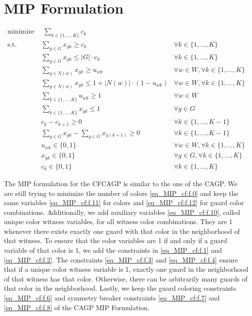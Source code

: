 \section{MIP Formulation}

\begin{align}
\label{eq_MIP_cf:f.0} \mbox{minimize}~& \;\sum_{k\in \{1,\ldots,K\}} c_{k}& \\
\label{eq_MIP_cf:f.1} \mbox{s.t. } &\sum_{g \in G}x_{gk} \geq c_{k} & \forall k\in \{1,\ldots,K\}\\
\label{eq_MIP_cf:f.2}&\sum_{g\in G}x_{gk} \leq |G|\cdot  c_{k} & \forall k\in \{1,\ldots,K\}\\
\label{eq_MIP_cf:f.3}&\sum_{g\in N(w)}x_{gk} \geq u_{wk} & \forall w\in W, \forall k\in \{1,\ldots,K\}\\
\label{eq_MIP_cf:f.4}&\sum_{g\in N(w)}x_{gk} \leq 1 + |N(w)|\cdot  (1-u_{wk}) & \forall w\in W, \forall k\in \{1,\ldots,K\}\\
\label{eq_MIP_cf:f.5}&\sum_{k\in \{1,\ldots,K\}}u_{wk} \geq 1 & \forall w\in W\\
\label{eq_MIP_cf:f.6}&\sum_{k\in \{1,\ldots,K\}}x_{gk} \leq 1 & \forall g\in G\\
\label{eq_MIP_cf:f.7}&c_{k} - c_{k+1} \geq 0 & \forall k\in \{1,\ldots,K-1\}\\
\label{eq_MIP_cf:f.8}&\sum_{g\in G}x_{gk} - \sum_{g\in G}x_{g(k+1)} \geq 0 & \forall k\in \{1,\ldots,K-1\}\\
\label{eq_MIP_cf:f.10}& u_{wk} \in \{0,1\} & \forall w\in W, \forall k\in \{1,\ldots,K\}\\
\label{eq_MIP_cf:f.11}& x_{gk} \in \{0,1\} & \forall g\in G, \forall k\in \{1,\ldots,K\}\\
\label{eq_MIP_cf:f.12}& c_{k}\in \{0,1\} & \forall k\in \{1,\ldots,K\}
\end{align}

The MIP formulation for the CFCAGP is similar to the one of the CAGP. We are still trying to minimize the number of colors \cref{eq_MIP_cf:f.0} and keep the same variables \cref{eq_MIP_cf:f.11} for colors and \cref{eq_MIP_cf:f.12} for guard color combinations. Additionally, we add auxiliary variables \cref{eq_MIP_cf:f.10}, called unique color witness variables, for all witness color combinations. They are 1 whenever there exists exactly one guard with that color in the neighborhood of that witness. To ensure that the color variables are 1 if and only if a guard variable of that color is 1, we add the constraints in \cref{eq_MIP_cf:f.1} and \cref{eq_MIP_cf:f.2}. The constraints \cref{eq_MIP_cf:f.3} and \cref{eq_MIP_cf:f.4} ensure that if a unique color witness variable is 1, exactly one guard in the neighborhood of that witness has that color. Otherwise, there can be arbitrarily many guards of that color in the neighborhood. Lastly, we keep the guard coloring constraints \cref{eq_MIP_cf:f.6} and symmetry breaker constraints \cref{eq_MIP_cf:f.7} and \cref{eq_MIP_cf:f.8} of the CAGP MIP Formulation.

